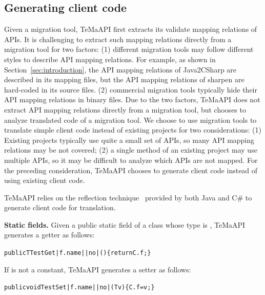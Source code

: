 \subsection{Generating client code}
\label{sec:approach:generating}
Given a migration tool, TeMaAPI first extracts its validate mapping relations of APIs. It is challenging to extract such mapping relations directly from a migration tool for two factors: (1) different migration tools may follow different styles to describe API mapping relations. For example, as shown in Section~\ref{sec:introduction}, the API mapping relations of Java2CSharp are described in its mapping files, but the API mapping relations of sharpen are hard-coded in its source files. (2) commercial migration tools typically hide their API mapping relations in binary files. Due to the two factors, TeMaAPI does not extract API mapping relations directly from a migration tool, but chooses to analyze translated code of a migration tool. We choose to use migration tools to translate simple client code instead of existing projects for two considerations: (1) Existing projects typically use quite a small set of APIs, so many API mapping relations may be not covered; (2) a single method of an existing project may use multiple APIs, so it may be difficult to analyze which APIs are not mapped. For the preceding consideration, TeMaAPI chooses to generate client code instead of using existing client code.

TeMaAPI relies on the reflection technique~\cite{maes1987concepts} provided by both Java and C\# to generate client code for translation.

\textbf{Static fields.} Given a public static field  of a class  whose type is , TeMaAPI generates a getter as follows:
\begin{CodeOut}%
\begin{alltt}
 public T TestGet|f.name||no|()\{ return C.f; \}
\end{alltt}
\end{CodeOut}

If  is not a constant, TeMaAPI generates a setter as follows:
\begin{CodeOut}%
\begin{alltt}
 public void TestSet|f.name||no|(T v)\{ C.f = v; \}
\end{alltt}
\end{CodeOut}

